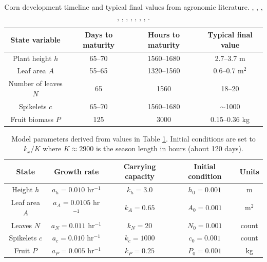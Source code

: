 \documentclass[preprint,12pt]{elsarticle}
\begin{document}
\begin{table}[ht]
\centering
\begin{tabular}{|c|c|c|c|}
\hline
State variable       & Days to maturity & Hours to maturity & Typical final value \\
\hline\hline
Plant height $h$     & 65--70           & 1560--1680        & 2.7--3.7 m          \\
Leaf area $A$        & 55--65           & 1320--1560        & 0.6--0.7 m$^{2}$    \\
Number of leaves $N$ & 65               & 1560              & 18--20              \\
Spikelets $c$        & 65--70           & 1560--1680        & $\sim$1000          \\
Fruit biomass $P$    & 125              & 3000              & 0.15--0.36 kg       \\
\hline
\end{tabular}
\caption{Corn development timeline and typical final values from agronomic literature. \cite{corn-growth-stages,corn-physiology}, \cite{bayer2018height_difference_corn}, \cite{kellersfarmstand2018sweetcorn_fieldcorn_height}, \cite{nanda2017corn_leaf_number_maturity}, \cite{nielsen2025tassel_emergence_pollen_shed}, \cite{ufseeds2024pencil_cob_corn_seed}, \cite{bayer2020corn_growth_stages_gdu}, \cite{ucdavis2024corn_crop_development}, \cite{sisson2020corn_growth_stages}, \cite{westco_corn_growth}, \cite{cornstates2018corn_growth_stages_gdu}.}
\label{tab:corn-development}
\end{table}

\begin{table}[ht]
\centering
\begin{tabular}{|c|c|c|c|c|}
\hline
State         & Growth rate                & Carrying capacity & Initial condition & Units   \\
\hline\hline
Height $h$    & $a_{h} = 0.010$  hr$^{-1}$ & $k_{h} = 3.0$     & $h_{0} = 0.001$   & m       \\
Leaf area $A$ & $a_{A} = 0.0105$ hr$^{-1}$ & $k_{A} = 0.65$    & $A_{0} = 0.001$   & m$^{2}$ \\
Leaves $N$    & $a_{N} = 0.011$  hr$^{-1}$ & $k_{N} = 20$      & $N_{0} = 0.001$   & count   \\
Spikelets $c$ & $a_{c} = 0.010$  hr$^{-1}$ & $k_{c} = 1000$    & $c_{0} = 0.001$   & count   \\
Fruit $P$     & $a_{P} = 0.005$  hr$^{-1}$ & $k_{P} = 0.25$    & $P_{0} = 0.001$   & kg      \\
\hline
\end{tabular}
\caption{Model parameters derived from values in Table \ref{tab:corn-development}. Initial conditions are set to $k_{x}/K$ where $K \approx 2900$ is the season length in hours (about 120 days).}
\label{tab:model-params}
\end{table}
\end{document}
